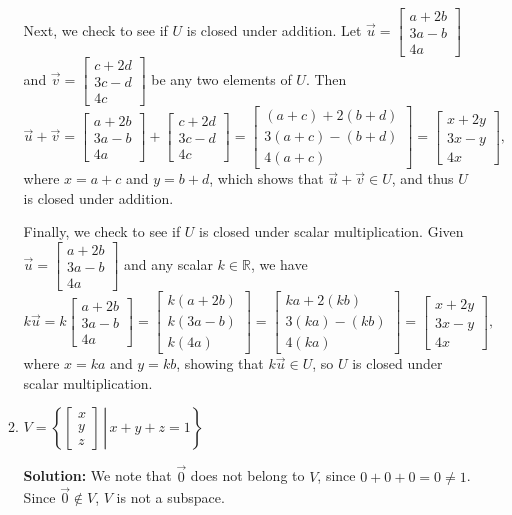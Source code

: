 \documentclass[letterpaper,12pt]{amsart}
\newcommand{\R}{\mathbb{R}}
\newcommand{\bbm}{\begin{bmatrix}}
\newcommand{\ebm}{\end{bmatrix}}
\begin{document}
\begin{enumerate}
\begin{enumerate}
Next, we check to see if $U$ is closed under addition. Let $\vec{u} = \bbm a+2b\\3a-b\\4a\ebm$ and $\vec{v} = \bbm c+2d\\3c-d\\4c\ebm$ be any two elements of $U$. Then
\[
 \vec{u}+\vec{v} = \bbm a+2b\\3a-b\\4a\ebm+\bbm c+2d\\3c-d\\4c\ebm = \bbm (a+c) + 2(b+d)\\3(a+c)-(b+d)\\4(a+c)\ebm = \bbm x+2y\\3x-y\\4x\ebm,
\]
where $x=a+c$ and $y=b+d$, which shows that $\vec{u}+\vec{v}\in U$, and thus $U$ is closed under addition.

Finally, we check to see if $U$ is closed under scalar multiplication. Given $\vec{u} = \bbm a+2b\\3a-b\\4a\ebm$ and any scalar $k\in\R$, we have
\[
 k\vec{u} = k\bbm a+2b\\3a-b\\4a\ebm = \bbm k(a+2b)\\k(3a-b)\\k(4a)\ebm = \bbm ka+2(kb)\\3(ka)-(kb)\\4(ka)\ebm = \bbm x+2y\\3x-y\\4x\ebm,
\]
where $x=ka$ and $y=kb$, showing that $k\vec{u}\in U$, so $U$ is closed under scalar multiplication.

\bigskip

 \item $V = \left\{\left.\bbm x\\y\\z\ebm\,\right|\, x+y+z=1\right\}$

\bigskip

{\bf Solution:} We note that $\vec{0}$ does not belong to $V$, since $0+0+0=0\neq 1$. Since $\vec{0}\notin V$, $V$ is not a subspace.
\end{enumerate}


\bigskip


\end{enumerate}
\end{document}
